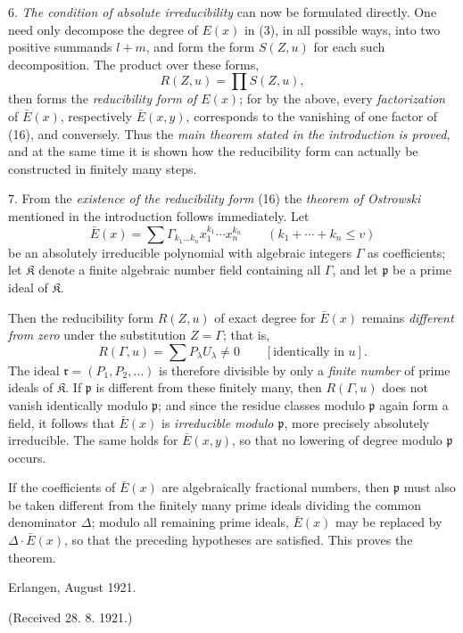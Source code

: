 \documentclass[11pt]{article}
\begin{document}
6. \emph{The condition of absolute irreducibility} can now be formulated directly. One need only decompose the degree of $E(x)$ in (3), in all possible ways, into two positive summands $l+m$, and form the form $S(Z,u)$ for each such decomposition. The product over these forms,
\begin{equation}
 R(Z,u)=\prod S(Z,u),
\tag{16}
\end{equation}
then forms the \emph{reducibility form of $E(x)$}; for by the above, every \emph{factorization} of $\bar E(x)$, respectively $\bar E(x,y)$, corresponds to the vanishing of one factor of (16), and conversely. Thus the \emph{main theorem stated in the introduction is proved}, and at the same time it is shown how the reducibility form can actually be constructed in finitely many steps.

7. From the \emph{existence of the reducibility form} (16) the \emph{theorem of Ostrowski} mentioned in the introduction follows immediately. Let
\[
 \bar E(x)=\sum \Gamma_{k_1\ldots k_n}x_1^{k_1}\cdots x_n^{k_n}
 \qquad(k_1+\cdots+k_n\le v)
\]
be an absolutely irreducible polynomial with algebraic integers $\Gamma$ as coefficients; let $\mathfrak K$ denote a finite algebraic number field containing all $\Gamma$, and let $\mathfrak p$ be a prime ideal of $\mathfrak K$.

Then the reducibility form $R(Z,u)$ of exact degree for $\bar E(x)$ remains \emph{different from zero} under the substitution $Z=\Gamma$; that is,
\[
 R(\Gamma,u)=\sum P_\lambda U_\lambda\ne0\qquad[\text{identically in }u].
\]
The ideal $\mathfrak r=(P_1,P_2,\ldots)$ is therefore divisible by only a \emph{finite number} of prime ideals of $\mathfrak K$. If $\mathfrak p$ is different from these finitely many, then $R(\Gamma,u)$ does not vanish identically modulo $\mathfrak p$; and since the residue classes modulo $\mathfrak p$ again form a field, it follows that $\bar E(x)$ is \emph{irreducible modulo $\mathfrak p$}, more precisely absolutely irreducible. The same holds for $\bar E(x,y)$, so that no lowering of degree modulo $\mathfrak p$ occurs.

If the coefficients of $\bar E(x)$ are algebraically fractional numbers, then $\mathfrak p$ must also be taken different from the finitely many prime ideals dividing the common denominator $\Delta$; modulo all remaining prime ideals, $\bar E(x)$ may be replaced by $\Delta\cdot\bar E(x)$, so that the preceding hypotheses are satisfied. This proves the theorem.

\begin{flushleft}
Erlangen, August 1921.
\end{flushleft}
\begin{center}
(Received 28. 8. 1921.)
\end{center}
\end{document}
